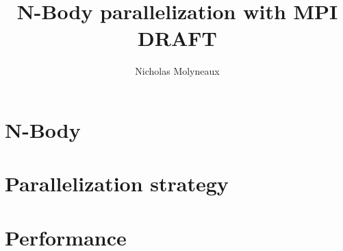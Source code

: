 \documentclass[a4paper,10pt]{article}
\begin{document}
\setlength{\parindent}{0pt}
\setlength{\parskip}{5pt plus 1pt minus 1pt}

\title{N-Body parallelization with MPI\\ DRAFT}
\author{Nicholas Molyneaux}
\vspace{-4cm}
\maketitle



\section{N-Body}

\section{Parallelization strategy}

\section{Performance}

\nocite{*}

\end{document}
